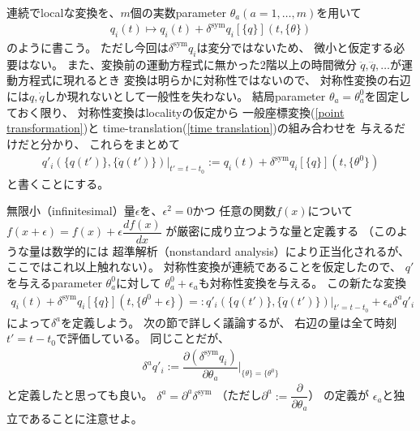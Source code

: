 連続でlocalな変換を、$m$個の実数parameter
$\theta_a (a=1,\dots,m)$を用いて
\begin{align}
  q_i(t) \mapsto q_i(t) +
  \delta^{\mathrm{sym}} q_i[\{ q \}] (t, \{\theta\})
\end{align}
のように書こう。
ただし今回は$\delta^{\mathrm{sym}} q_i$は変分ではないため、
微小と仮定する必要はない。
また、変換前の運動方程式に無かった2階以上の時間微分
$\ddot{q}, \dddot{q},\dots$が運動方程式に現れるとき
変換は明らかに対称性ではないので、
対称性変換の右辺には$q, \dot{q}$しか現れないとして一般性を失わない。
結局parameter $\theta_a = \theta_a^0$を固定しておく限り、
対称性変換はlocalityの仮定から
一般座標変換(\ref{point transformation})と
time-translation(\ref{time translation})の組み合わせを
与えるだけだと分かり、
これらをまとめて
\begin{align}
  q'_i( \{ q(t') \}, \{ \dot{q}(t') \} )
    \Big|_{t' = t - t_0}
  := q_i(t) +
  \delta^{\mathrm{sym}} q_i[\{ q \}] (t, \{\theta^0\})
\end{align}
と書くことにする。

無限小（infinitesimal）量$\epsilon$を、$\epsilon^2 = 0$かつ
任意の関数$f(x)$について
$f(x+\epsilon)=f(x) + \epsilon \dfrac{df(x)}{dx}$
が厳密に成り立つような量と定義する
（このような量は数学的には
超準解析（nonstandard analysis）により正当化されるが、
ここではこれ以上触れない）。
対称性変換が連続であることを仮定したので、
$q'$を与えるparameter $\theta_a^0$に対して
$\theta_a^0 + \epsilon_a$も対称性変換を与える。
この新たな変換
\begin{align}
  q_i(t) +
  \delta^{\mathrm{sym}} q_i[\{ q \}] (t, \{\theta^0 + \epsilon\})
  =:
  q'_i( \{ q(t') \}, \{ \dot{q}(t') \} )
    \Big|_{t' = t - t_0}
  + \epsilon_a \delta^a q'_i
\end{align}
によって$\delta^a$を定義しよう。
次の節で詳しく議論するが、
右辺の量は全て時刻$t' = t - t_0$で評価している。
同じことだが、
\begin{align}
  \delta^a q'_i :=
  \dfrac{\partial
    (\delta^{\mathrm{sym}} q_i)
  }{
    \partial \theta_a
  }
  \Bigg|_{\{\theta\} = \{\theta^0\}}
\end{align}
と定義したと思っても良い。
$\delta^a = \partial^a \delta^{\mathrm{sym}}$
（ただし$\partial^a := \dfrac{\partial}{\partial \theta_a}$）
の定義が
$\epsilon_a$と独立であることに注意せよ。

